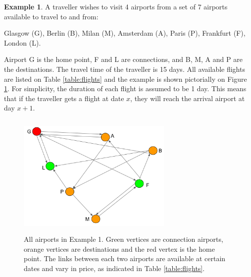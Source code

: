 \documentclass{mprop}
\theoremstyle{definition}
\newtheorem{example}{Example}
\begin{document}
\begin{example}
\label{example1}
A traveller wishes to visit 4 airports from a set of 7 airports available to travel to and from: 

Glasgow (G), Berlin (B), Milan (M), Amsterdam (A), Paris (P), Frankfurt (F), London (L).

Airport G is the home point, F and L are connections, and B, M, A and P are the destinations. The travel time of the traveller is 15 days. All available flights are listed on Table \ref{table:flights} and the example is shown pictorially on Figure \ref{fig:map}. For simplicity, the duration of each flight is assumed to be 1 day. This means that if the traveller gets a flight at date $x$, they will reach the arrival airport at day $x+1$.

\begin{figure}
\centering
\includegraphics[height=6cm, width=7.5cm]{images/map.png}
\caption{All airports in Example 1. Green vertices are connection airports, orange vertices are destinations and the red vertex is the home point. The links between each two airports are available at certain dates and vary in price, as indicated in Table \ref{table:flights}.}
\label{fig:map}
\end{figure}


\end{example}
\end{document}

